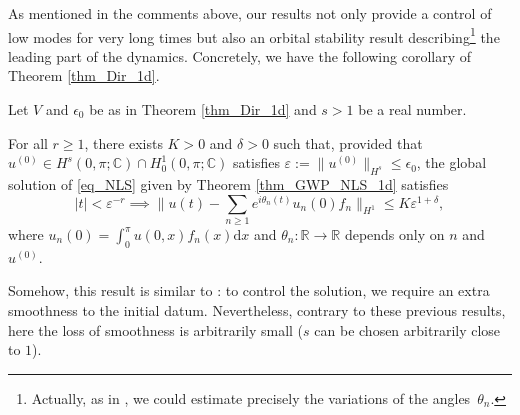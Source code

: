 As mentioned in the comments above, our results not only provide a control of low modes for very long times but also an orbital stability result describing\footnote{Actually, as in \cite[Th.\,1]{KtA}, we could estimate precisely the variations of the angles~$\theta_n$.} the leading part of the dynamics. Concretely, we have the following corollary of Theorem \ref{thm_Dir_1d}.
\begin{corollary}[Case $\Omega = \Omega^{\mathrm{Dir}}_1$] \label{cor_whaou}
Let $V$ and $\epsilon_0$ be as in Theorem \ref{thm_Dir_1d} and $s> 1$ be a real number.

For all $r\geq 1$, there exists $K>0$ and $\delta >0$ such that, provided that $u^{(0)}\in H^s(0,\pi;\mathbb{C}) \cap H^1_0(0,\pi;\mathbb{C})$ satisfies $\varepsilon:= \| u^{(0)} \|_{H^s} \leq \epsilon_0$, the global solution of \eqref{eq_NLS} given by Theorem \ref{thm_GWP_NLS_1d} satisfies
\[
|t|< \varepsilon^{-r} \implies \biggl\| u(t) - \sum_{n\geq 1} e^{i\theta_n(t)} u_n(0) f_n \biggr\|_{H^1} \leq K \varepsilon^{1+\delta},
\]
where $u_n(0) = \int_0^\pi u(0,x) f_n(x) \mathrm{d}x$ and $\theta_n: \mathbb{R} \to \mathbb{R}$ depends only on $n$ and $u^{(0)}$.
\end{corollary}
Somehow, this result is similar to \cite{Bou96,BFG20b}: to control the solution, we require an extra smoothness to the initial datum. Nevertheless, contrary to these previous results, here the loss of smoothness is arbitrarily small (\ie $s$ can be chosen arbitrarily close to $1$).

